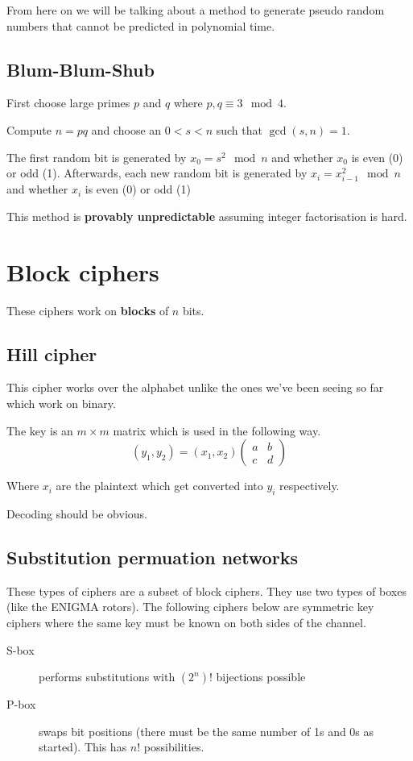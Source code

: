 \documentclass{report}
\begin{document}
From here on we will be talking about a method to generate pseudo random
numbers that cannot be predicted in polynomial time.

\section{Blum-Blum-Shub}
First choose large primes $p$ and $q$ where $p,q \equiv 3 \mod 4$.

Compute $n = pq$ and choose an $0 < s < n$ such that $\gcd(s,n) = 1$.

The first random bit is generated by $x_0 = s^2 \mod n$ and whether $x_0$
is even (0) or odd (1). Afterwards, each new random bit is generated by
$x_i = x_{i-1}^2 \mod n$ and whether $x_i$ is even (0) or odd (1)

This method is \textbf{provably unpredictable} assuming integer factorisation
is hard.

\chapter{Block ciphers}
These ciphers work on \textbf{blocks} of $n$ bits.

\section{Hill cipher}
This cipher works over the alphabet unlike the ones we've been seeing so far
which work on binary.

The key is an $m \times m$ matrix which is used in the following way.
\[
    (y_1, y_2) = (x_1, x_2)
    \begin{pmatrix}
        a & b \\
        c & d
    \end{pmatrix}
\]

Where $x_i$ are the plaintext which get converted into $y_i$ respectively.

Decoding should be obvious.

\section{Substitution permuation networks}
These types of ciphers are a subset of block ciphers. They use two types
of boxes (like the ENIGMA rotors). The following ciphers below are
symmetric key ciphers where the same key must be known on both sides of the
channel.

\begin{description}
    \item [S-box] performs substitutions with $(2^n)!$ bijections possible
    \item [P-box] swaps bit positions (there must be the same number of 1s
        and 0s as started). This has $n!$ possibilities.
\end{description}
\end{document}
